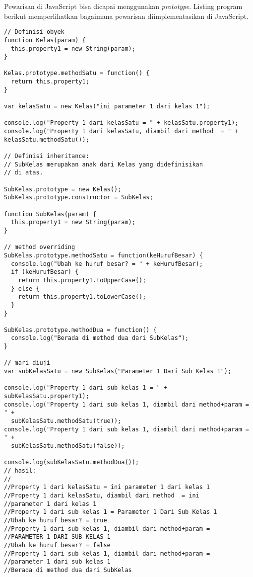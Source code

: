 Pewarisan di JavaScript bisa dicapai menggunakan \textit{prototype}. Listing program berikut memperlihatkan bagaimana pewarisan diimplementasikan di JavaScript.

\lstset{language=JavaScript,caption=Pewarisan di PBO JavaScript}
\begin{lstlisting}
// Definisi obyek
function Kelas(param) {
  this.property1 = new String(param);
}

Kelas.prototype.methodSatu = function() {
  return this.property1; 
}

var kelasSatu = new Kelas("ini parameter 1 dari kelas 1");

console.log("Property 1 dari kelasSatu = " + kelasSatu.property1);
console.log("Property 1 dari kelasSatu, diambil dari method  = " + kelasSatu.methodSatu());

// Definisi inheritance:
// SubKelas merupakan anak dari Kelas yang didefinisikan
// di atas.

SubKelas.prototype = new Kelas();
SubKelas.prototype.constructor = SubKelas;

function SubKelas(param) {
  this.property1 = new String(param);
}

// method overriding
SubKelas.prototype.methodSatu = function(keHurufBesar) {
  console.log("Ubah ke huruf besar? = " + keHurufBesar);
  if (keHurufBesar) {
    return this.property1.toUpperCase();
  } else {
    return this.property1.toLowerCase();
  }
}

SubKelas.prototype.methodDua = function() {
  console.log("Berada di method dua dari SubKelas");
}

// mari diuji
var subKelasSatu = new SubKelas("Parameter 1 Dari Sub Kelas 1");

console.log("Property 1 dari sub kelas 1 = " + subKelasSatu.property1);
console.log("Property 1 dari sub kelas 1, diambil dari method+param = " + 
  subKelasSatu.methodSatu(true));
console.log("Property 1 dari sub kelas 1, diambil dari method+param = " +
  subKelasSatu.methodSatu(false));

console.log(subKelasSatu.methodDua());
// hasil:
//
//Property 1 dari kelasSatu = ini parameter 1 dari kelas 1
//Property 1 dari kelasSatu, diambil dari method  = ini 
//parameter 1 dari kelas 1
//Property 1 dari sub kelas 1 = Parameter 1 Dari Sub Kelas 1
//Ubah ke huruf besar? = true
//Property 1 dari sub kelas 1, diambil dari method+param = 
//PARAMETER 1 DARI SUB KELAS 1
//Ubah ke huruf besar? = false
//Property 1 dari sub kelas 1, diambil dari method+param = 
//parameter 1 dari sub kelas 1
//Berada di method dua dari SubKelas
\end{lstlisting}
